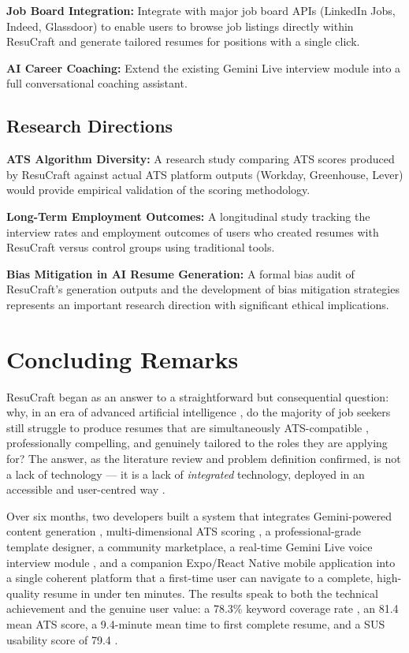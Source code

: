 \documentclass[12pt, a4paper, oneside]{report}
\begin{document}
\textbf{Job Board Integration:} Integrate with major job board APIs (LinkedIn Jobs, Indeed, Glassdoor) to enable users to browse job listings directly within ResuCraft and generate tailored resumes for positions with a single click.

\textbf{AI Career Coaching:} Extend the existing Gemini Live interview module \cite{geminidocs2024} into a full conversational coaching assistant.

\subsection{Research Directions}

\textbf{ATS Algorithm Diversity:} A research study comparing ATS scores produced by ResuCraft against actual ATS platform outputs (Workday, Greenhouse, Lever) \cite{jobscan2021} would provide empirical validation of the scoring methodology.

\textbf{Long-Term Employment Outcomes:} A longitudinal study tracking the interview rates and employment outcomes of users who created resumes with ResuCraft versus control groups using traditional tools.

\textbf{Bias Mitigation in AI Resume Generation:} A formal bias audit of ResuCraft's generation outputs and the development of bias mitigation strategies represents an important research direction with significant ethical implications.

\section{Concluding Remarks}

ResuCraft began as an answer to a straightforward but consequential question: why, in an era of advanced artificial intelligence \cite{gemini2023}, do the majority of job seekers still struggle to produce resumes that are simultaneously ATS-compatible \cite{jobscan2021}, professionally compelling, and genuinely tailored to the roles they are applying for? The answer, as the literature review and problem definition confirmed, is not a lack of technology --- it is a lack of \textit{integrated} technology, deployed in an accessible and user-centred way \cite{wcag21}.

Over six months, two developers built a system that integrates Gemini-powered content generation \cite{gemini2023}, multi-dimensional ATS scoring \cite{jobscan2021}, a professional-grade template designer, a community marketplace, a real-time Gemini Live voice interview module \cite{geminidocs2024}, and a companion Expo/React Native mobile application into a single coherent platform that a first-time user can navigate to a complete, high-quality resume in under ten minutes. The results speak to both the technical achievement and the genuine user value: a 78.3\% keyword coverage rate \cite{qin2018}, an 81.4 mean ATS score, a 9.4-minute mean time to first complete resume, and a SUS usability score of 79.4 \cite{sus1996}.
\end{document}
